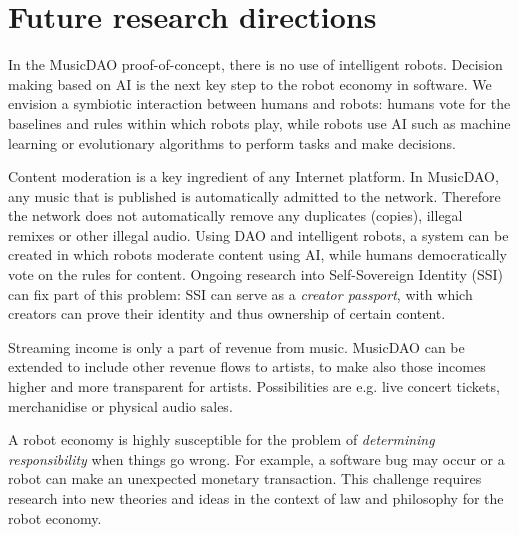 \section{Future research directions}
In the MusicDAO proof-of-concept, there is no use of intelligent robots. Decision making based on AI is the next key step to the robot economy in software. We envision a symbiotic interaction between humans and robots: humans vote for the baselines and rules within which robots play, while robots use AI such as machine learning or evolutionary algorithms to perform tasks and make decisions. 

Content moderation is a key ingredient of any Internet platform. In MusicDAO, any music that is published is automatically admitted to the network. Therefore the network does not automatically remove any duplicates (copies), illegal remixes or other illegal audio. Using DAO and intelligent robots, a system can be created in which robots moderate content using AI, while humans democratically vote on the rules for content. Ongoing research into Self-Sovereign Identity (SSI) can fix part of this problem: SSI can serve as a \textit{creator passport}, with which creators can prove their identity and thus ownership of certain content.


Streaming income is only a part of revenue from music. MusicDAO can be extended to include other revenue flows to artists, to make also those incomes higher and more transparent for artists. Possibilities are e.g. live concert tickets, merchanidise or physical audio sales.

A robot economy is highly susceptible for the problem of \textit{determining responsibility} when things go wrong. For example, a software bug may occur or a robot can make an unexpected monetary transaction. This challenge requires research into new theories and ideas in the context of law and philosophy for the robot economy.

